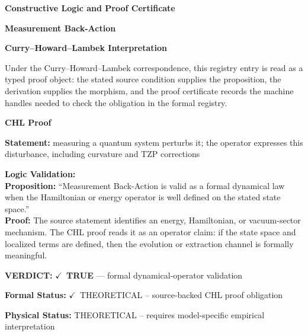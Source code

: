 \clearpage
\begingroup\tzpsupportsetup
\noindent\textbf{\fontsize{10.8pt}{12.8pt}\selectfont [ID 0063] Constructive Logic and Proof Certificate}\par
\noindent\textbf{\fontsize{10pt}{12pt}\selectfont Measurement Back-Action}\par
\vspace{0.45em}
\begingroup
\footnotesize
\setlength{\parskip}{0.22em}
\setlength{\parindent}{0pt}
\noindent\textbf{Curry--Howard--Lambek Interpretation}\par
Under the Curry--Howard--Lambek correspondence, this registry entry is read as a typed proof
object: the stated source condition supplies the proposition, the derivation supplies the
morphism, and the proof certificate records the machine handles needed to check the obligation
in the formal registry.

\vspace{0.45em}
\noindent\textbf{CHL Proof}\par
\textbf{Statement:} measuring a quantum system perturbs it; the operator expresses this disturbance,
including curvature and TZP corrections

\textbf{Logic Validation:}\\
\textbf{Proposition:} ``Measurement Back-Action is valid as a formal dynamical law when the Hamiltonian or
energy operator is well defined on the stated state space.''\\
\textbf{Proof:} The source statement identifies an energy, Hamiltonian, or vacuum-sector mechanism. The
CHL proof reads it as an operator claim: if the state space and localized terms are
defined, then the evolution or extraction channel is formally meaningful.

\textbf{VERDICT:} \ensuremath{\checkmark}\ \textbf{TRUE} --- formal dynamical-operator validation

\textbf{Formal Status:} \ensuremath{\checkmark}\ THEORETICAL -- source-backed CHL proof obligation

\textbf{Physical Status:} THEORETICAL -- requires model-specific empirical interpretation
\par\vspace{0.45em}
\par
\ifTZPDarkEdition
{}
\fi
\endgroup
\endgroup
